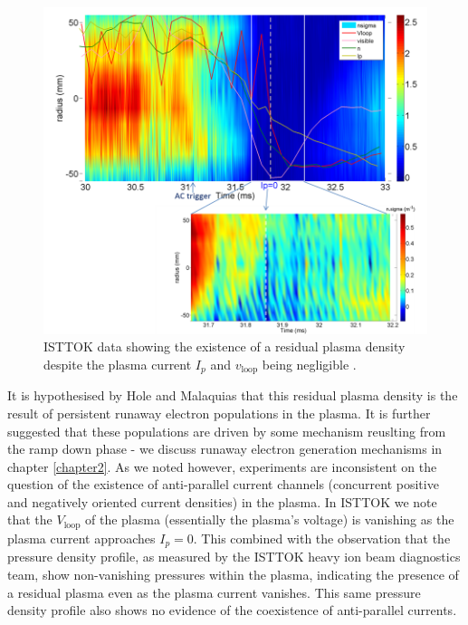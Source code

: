 \begin{figure}[h!]
    \centering
    \includegraphics[scale=1]{imgs/c1/residual-plasma.png}
    \caption{ISTTOK data showing the existence of a residual plasma density despite the plasma current $I_p$ and 
    $v_{\text{loop}}$ being negligible \cite{malaquias-matthew}.}
\end{figure}

It is hypothesised by Hole and Malaquias that this residual plasma density is the result of 
persistent runaway electron populations in the plasma. It is further suggested that these populations
are driven by some mechanism reuslting from the ramp down phase - we discuss runaway electron generation 
mechanisms in chapter \ref{chapter2}. As we noted however, experiments are inconsistent on the question of 
the existence of anti-parallel current channels (concurrent positive and negatively oriented current densities) in the plasma. 
In ISTTOK we note that the $V_{\text{loop}}$ of the plasma (essentially the plasma's voltage) is vanishing as the plasma 
current approaches $I_p = 0$. This combined with the observation that the pressure density profile, as measured 
by the ISTTOK heavy ion beam diagnostics team, show non-vanishing pressures within the plasma, indicating 
the presence of a residual plasma even as the plasma current vanishes. This same pressure density profile 
also shows no evidence of the coexistence of anti-parallel currents.

